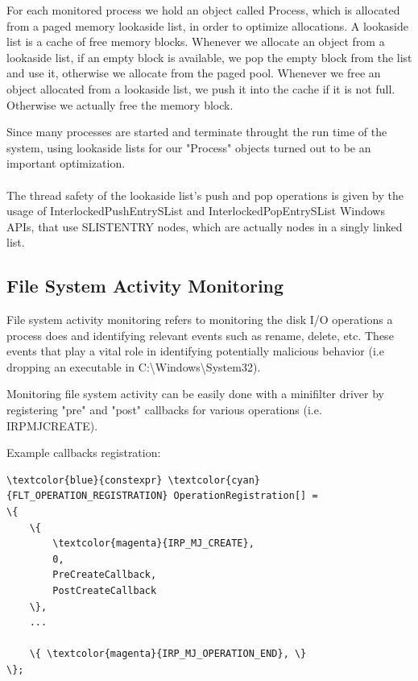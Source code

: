         For each monitored process we hold an object called Process, which is allocated from a paged memory lookaside list, in order to
        optimize allocations. A lookaside list is a cache of free memory blocks. Whenever we allocate an object from a lookaside list, if
        an empty block is available, we pop the empty block from the list and use it, otherwise we allocate from the paged pool. Whenever we
        free an object allocated from a lookaside list, we push it into the cache if it is not full. Otherwise we actually free the memory block.

        Since many processes are started and terminate throught the run time of the system, using lookaside lists for our "Process" objects
        turned out to be an important optimization.
        
        \paragraph{}
        The thread safety of the lookaside list's push and pop operations is given by the usage of InterlockedPushEntrySList and
        InterlockedPopEntrySList Windows APIs, that use SLIST\textunderscore ENTRY nodes, which are actually nodes in a singly linked list.

        \subsection{File System Activity Monitoring}
        File system activity monitoring refers to monitoring the disk I/O operations a process does and identifying relevant events such as
        rename, delete, etc. These events that play a vital role in identifying potentially malicious behavior (i.e dropping an executable in
        C:\textbackslash Windows\textbackslash System32).
        
        Monitoring file system activity can be easily done with a minifilter driver by
        registering "pre" and "post" callbacks for various operations (i.e. IRP\textunderscore MJ\textunderscore CREATE).

    Example callbacks registration:

    \begin{Verbatim}[fontsize=\small, commandchars=\\\{\}]
\textcolor{blue}{constexpr} \textcolor{cyan}{FLT_OPERATION_REGISTRATION} OperationRegistration[] =
\{
    \{
        \textcolor{magenta}{IRP_MJ_CREATE},
        0,
        PreCreateCallback,
        PostCreateCallback
    \},
    ...
    
    \{ \textcolor{magenta}{IRP_MJ_OPERATION_END}, \}
\};
    \end{Verbatim}

